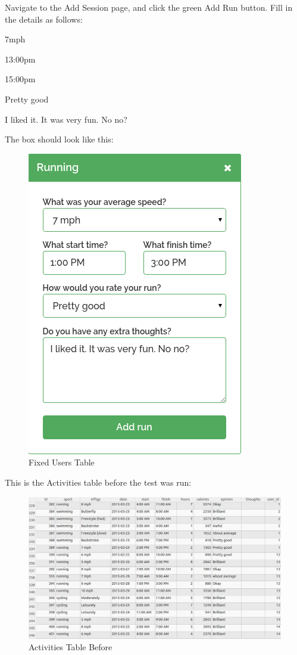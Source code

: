 \documentclass{article}[12pt,a4paper]
\begin{document}
{\setlength{\parindent}{0cm}
Navigate to the Add Session page, and click the green Add Run button. Fill in the details as follows:
\begin{description}[labelindent=1cm]
  \item[Average Speed:] 7mph
  \item[Start Time:] 13:00pm
  \item[Finish Time:] 15:00pm
  \item[Rating:] Pretty good
  \item[Extra Thoughts:] I liked it. It was very fun. No no?
\end{description}
The box should look like this:
\begin{figure}[h!]
    \includegraphics[scale=0.33]{images/testing/add_activity/activity_box}
    \caption{Fixed Users Table}
\end{figure}
}

\clearpage

This is the Activities table before the test was run:
\begin{figure}[h!]
    \includegraphics[scale=0.33]{images/testing/add_activity/database_before}
    \caption{Activities Table Before}
\end{figure}
\end{document}
